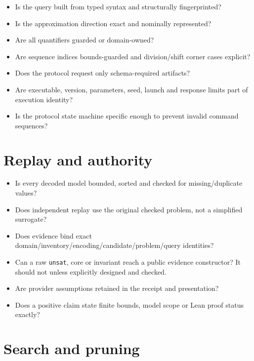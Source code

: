 \documentclass[11pt,oneside]{report}
\begin{document}
\begin{itemize}[leftmargin=2em]
\item Is the query built from typed syntax and structurally fingerprinted?
\item Is the approximation direction exact and nominally represented?
\item Are all quantifiers guarded or domain-owned?
\item Are sequence indices bounds-guarded and division/shift corner cases explicit?
\item Does the protocol request only schema-required artifacts?
\item Are executable, version, parameters, seed, launch and response limits part of execution identity?
\item Is the protocol state machine specific enough to prevent invalid command sequences?
\end{itemize}

\section{Replay and authority}

\begin{itemize}[leftmargin=2em]
\item Is every decoded model bounded, sorted and checked for missing/duplicate values?
\item Does independent replay use the original checked problem, not a simplified surrogate?
\item Does evidence bind exact domain/inventory/encoding/candidate/problem/query identities?
\item Can a raw \texttt{unsat}, core or invariant reach a public evidence constructor? It should not unless explicitly designed and checked.
\item Are provider assumptions retained in the receipt and presentation?
\item Does a positive claim state finite bounds, model scope or Lean proof status exactly?
\end{itemize}

\section{Search and pruning}
\end{document}

